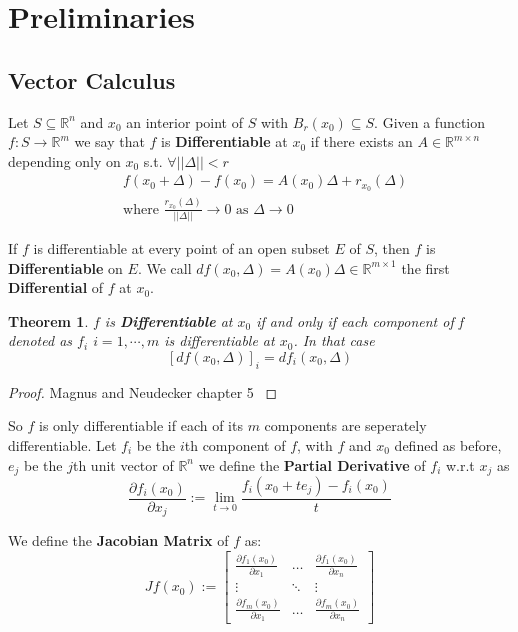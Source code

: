 \documentclass[]{article}
\theoremstyle{mattstyle}
\newtheorem{theorem}{Theorem}[section]
\theoremstyle{definition}
\begin{document}
\newpage

\section{Preliminaries}

\subsection{Vector Calculus}

Let $S \subseteq \mathbb{R}^n$ and $x_0$ an interior point of $S$ with $B_r(x_0) \subseteq S$. Given a function $f: S \rightarrow \mathbb{R}^m$ we say that $f$ is \textbf{Differentiable} at $x_0$ if there exists an $A \in \mathbb{R}^{m \times n}$ depending only on $x_0$ s.t. $\forall ||\Delta|| < r$
\begin{align*}
&f(x_0 + \Delta) - f(x_0) = A(x_0)\Delta + r_{x_0}(\Delta)\\
&\text{where $\frac{r_{x_0}(\Delta)}{||\Delta||}\rightarrow 0$ as $\Delta \rightarrow 0$}
\end{align*}

If $f$ is differentiable at every point of an open subset $E$ of $S$, then $f$ is \textbf{Differentiable} on $E$. We call $df(x_0, \Delta) = A(x_0)\Delta \in \mathbb{R}^{m \times 1}$ the first \textbf{Differential} of $f$ at $x_0$.

\begin{theorem}
	$f$ is \textbf{Differentiable} at $x_0$ if and only if each component of f denoted as $f_i$ $i=1,\cdots, m$ is differentiable at $x_0$. In that case $$[df(x_0, \Delta)]_i = df_i(x_0, \Delta)$$
\end{theorem}
\begin{proof}
	Magnus and Neudecker chapter 5 \cite{magnus1988matrix}
\end{proof}

So $f$ is only differentiable if each of its $m$ components are seperately differentiable. Let $f_i$ be the $i$th component of $f$, with $f$ and $x_0$ defined as before, $e_j$ be the $j$th unit vector of $\mathbb{R}^n$ we define the \textbf{Partial Derivative} of $f_i$ w.r.t $x_j$ as
$$
\frac{\partial f_i(x_0)}{\partial x_j} := \lim\limits_{t \rightarrow 0} \frac{f_i(x_0+te_j) - f_i(x_0)}{t}
$$

We define the \textbf{Jacobian Matrix} of $f$ as:
$$ Jf(x_0) :=  \begin{bmatrix}
\frac{\partial f_1(x_0)}{\partial x_1} & \dots  & \frac{\partial f_1(x_0)}{\partial x_n} \\
\vdots & \ddots & \vdots \\
\frac{\partial f_m(x_0)}{\partial x_1} & \dots  & \frac{\partial f_m(x_0)}{\partial x_n}
\end{bmatrix}$$
\end{document}
